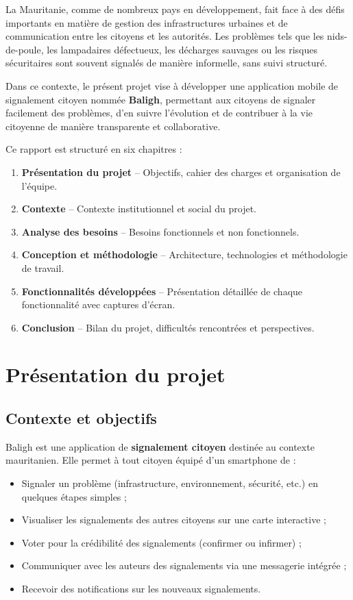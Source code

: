 \documentclass[12pt,a4paper]{report}
\begin{document}
La Mauritanie, comme de nombreux pays en développement, fait face à des défis importants en matière de gestion des infrastructures urbaines et de communication entre les citoyens et les autorités. Les problèmes tels que les nids-de-poule, les lampadaires défectueux, les décharges sauvages ou les risques sécuritaires sont souvent signalés de manière informelle, sans suivi structuré.

Dans ce contexte, le présent projet vise à développer une application mobile de signalement citoyen nommée \textbf{Baligh}, permettant aux citoyens de signaler facilement des problèmes, d'en suivre l'évolution et de contribuer à la vie citoyenne de manière transparente et collaborative.

Ce rapport est structuré en six chapitres :
\begin{enumerate}
    \item \textbf{Présentation du projet} -- Objectifs, cahier des charges et organisation de l'équipe.
    \item \textbf{Contexte} -- Contexte institutionnel et social du projet.
    \item \textbf{Analyse des besoins} -- Besoins fonctionnels et non fonctionnels.
    \item \textbf{Conception et méthodologie} -- Architecture, technologies et méthodologie de travail.
    \item \textbf{Fonctionnalités développées} -- Présentation détaillée de chaque fonctionnalité avec captures d'écran.
    \item \textbf{Conclusion} -- Bilan du projet, difficultés rencontrées et perspectives.
\end{enumerate}

\chapter{Présentation du projet}

\section{Contexte et objectifs}

Baligh est une application de \textbf{signalement citoyen} destinée au contexte mauritanien. Elle permet à tout citoyen équipé d'un smartphone de :
\begin{itemize}
    \item Signaler un problème (infrastructure, environnement, sécurité, etc.) en quelques étapes simples ;
    \item Visualiser les signalements des autres citoyens sur une carte interactive ;
    \item Voter pour la crédibilité des signalements (confirmer ou infirmer) ;
    \item Communiquer avec les auteurs des signalements via une messagerie intégrée ;
    \item Recevoir des notifications sur les nouveaux signalements.
\end{itemize}
\end{document}
